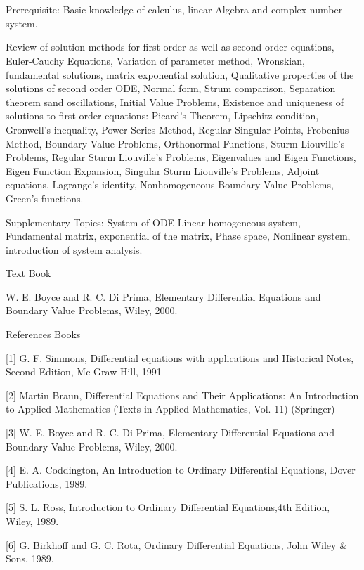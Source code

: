 \section{\courseinfo}


Prerequisite: Basic knowledge of calculus, linear Algebra and complex number system.  

Review of solution methods for first order as well as second order equations, Euler-Cauchy Equations, Variation of parameter method, Wronskian, fundamental solutions, matrix exponential solution, Qualitative properties of the solutions of second order ODE, Normal form, Strum comparison, Separation theorem sand oscillations, Initial Value Problems, Existence and uniqueness of solutions to first order equations: Picard’s Theorem, Lipschitz condition, Gronwell’s inequality, Power Series Method, Regular Singular Points, Frobenius Method, Boundary Value Problems, Orthonormal Functions, Sturm Liouville’s Problems, Regular Sturm Liouville’s Problems, Eigenvalues and Eigen Functions, Eigen Function Expansion, Singular Sturm Liouville’s Problems, Adjoint equations, Lagrange’s identity, Nonhomogeneous Boundary Value Problems, Green’s functions.

Supplementary Topics: System of ODE-Linear homogeneous system, Fundamental matrix, exponential of the matrix, Phase space, Nonlinear system, introduction of system analysis. 

Text Book

W. E. Boyce and R. C. Di Prima, Elementary Differential Equations and Boundary Value Problems, Wiley, 2000.

References Books

[1] G. F. Simmons, Differential equations with applications and Historical Notes, Second Edition, Mc-Graw Hill, 1991

[2] Martin Braun, Differential Equations and Their Applications: An Introduction to Applied Mathematics (Texts in Applied Mathematics, Vol. 11) (Springer)

[3] W. E. Boyce and R. C. Di Prima, Elementary Differential Equations and Boundary Value Problems, Wiley, 2000.

[4] E. A. Coddington, An Introduction to Ordinary Differential Equations, Dover Publications, 1989.

[5] S. L. Ross, Introduction to Ordinary Differential Equations,4th Edition, Wiley, 1989.

[6] G. Birkhoff and G. C. Rota, Ordinary Differential Equations, John Wiley \& Sons, 1989.

